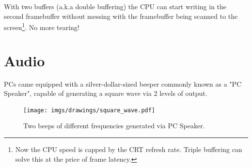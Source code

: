 \documentclass[book.tex]{subfiles}
\begin{document}
\par
With two buffers (a.k.a double buffering) the CPU can start writing in the second framebuffer without messing with the framebuffer being scanned to the screen\footnote{Now the CPU speed is capped by the CRT refresh rate. Triple buffering can solve this at the price of frame latency.}. No more tearing!
















\section{Audio}
\label{hardware-audio}
PCs came equipped with a silver-dollar-sized beeper commonly known as a "PC Speaker", capable of generating a square wave via 2 levels of output.\\
\par
 \begin{figure}[H]
\centering
\texttt{[image: imgs/drawings/square\_wave.pdf]}
\caption{Two beeps of different frequencies generated via PC Speaker.}
\end{figure}
\end{document}

